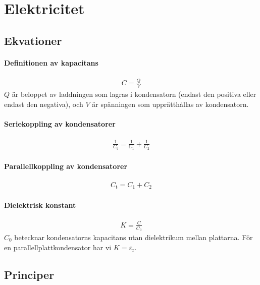 \section{Elektricitet}

\subsection{Ekvationer}

\paragraph{Definitionen av kapacitans}
\begin{align*}
	C = \frac{Q}{V}
\end{align*}
$Q$ är beloppet av laddningen som lagras i kondensatorn (endast den positiva eller endast den negativa), och $V$ är spänningen som upprätthållas av kondensatorn.

\paragraph{Seriekoppling av kondensatorer}
\begin{align*}
	\frac{1}{C_\text{t}} = \frac{1}{C_1} + \frac{1}{C_2}
\end{align*}

\deriv

\paragraph{Parallellkoppling av kondensatorer}
\begin{align*}
	C_\text{t} = C_1 + C_2
\end{align*}

\paragraph{Dielektrisk konstant}
\begin{align*}
	K = \frac{C}{C_0}
\end{align*}
$C_0$ betecknar kondensatorns kapacitans utan dielektrikum mellan plattarna. För en parallellplattkondensator har vi $K = \varepsilon_\text{r}$.

\subsection{Principer}